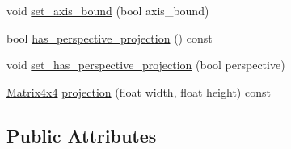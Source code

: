 \begin{DoxyCompactItemize}
\item 
void \mbox{\hyperlink{class_camera_a9f003408eb5324f88cca52221d825c8b}{set\+\_\+axis\+\_\+bound}} (bool axis\+\_\+bound)
\item 
bool \mbox{\hyperlink{class_camera_a0faf690094effa7365ada339b6cb1751}{has\+\_\+perspective\+\_\+projection}} () const
\item 
void \mbox{\hyperlink{class_camera_af88ca0b5be539ddf342dbdd0e2fb0f78}{set\+\_\+has\+\_\+perspective\+\_\+projection}} (bool perspective)
\item 
\mbox{\hyperlink{class_matrix4x4}{Matrix4x4}} \mbox{\hyperlink{class_camera_a97d7719189209c7f3976e838bf2bd6a7}{projection}} (float width, float height) const
\end{DoxyCompactItemize}
\subsection*{Public Attributes}
